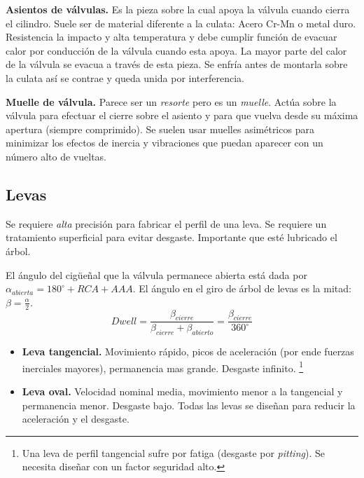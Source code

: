     \textbf{Asientos de válvulas.} Es la pieza sobre la cual apoya la válvula cuando cierra el cilindro. Suele ser de material diferente a la culata: Acero Cr-Mn o metal duro. Resistencia la impacto y alta temperatura y debe cumplir función de evacuar calor por conducción de la válvula cuando esta apoya. La mayor parte del calor de la válvula se evacua a través de esta pieza. Se enfría antes de montarla sobre la culata así se contrae y queda unida por interferencia.
    
    \textbf{Muelle de válvula.} Parece ser un \textit{resorte} pero es un \textit{muelle}. Actúa sobre la válvula para efectuar el cierre sobre el asiento y para que vuelva desde su máxima apertura (siempre comprimido). Se suelen usar muelles asimétricos para minimizar los efectos de inercia y vibraciones que puedan aparecer con un número alto de vueltas.   

\subsection{Levas} 
Se requiere \textit{alta} precisión para fabricar el perfil de una leva. Se requiere un tratamiento superficial para evitar desgaste. Importante que esté lubricado el árbol.

El ángulo del cigüeñal que la válvula permanece abierta está dada por $\alpha_{abierta}=180^\circ +RCA+AAA$. El ángulo en el giro de árbol de levas es la mitad: $\beta=\frac{\alpha}{2}$.
\[
Dwell=\frac{\beta_{cierre}}{\beta_{cierre}+\beta_{abierto}}=\frac{\beta_{cierre}}{360^\circ}
\]
\begin{itemize}
    \item \textbf{Leva tangencial.} Movimiento rápido, picos de aceleración (por ende fuerzas inerciales mayores), permanencia mas grande. Desgaste infinito. \footnote{Una leva de perfil tangencial sufre por fatiga (desgaste por \textit{pitting}). Se necesita diseñar con un factor seguridad alto.}
    \item \textbf{Leva oval.} Velocidad nominal media, movimiento menor a la tangencial y permanencia menor. Desgaste bajo. Todas las levas se diseñan para reducir la aceleración y el desgaste. 
\end{itemize}


